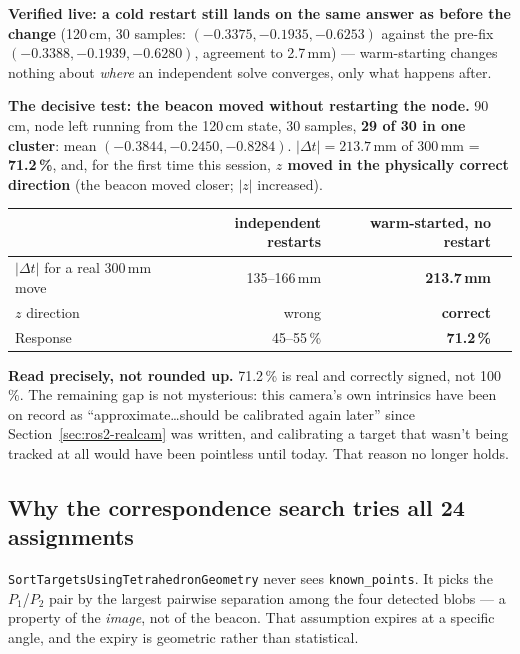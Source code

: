 \documentclass[11pt]{report}
\begin{document}
\textbf{Verified live: a cold restart still lands on the same answer as
before the change} (120\,cm, 30 samples: $(-0.3375,-0.1935,-0.6253)$ against
the pre-fix $(-0.3388,-0.1939,-0.6280)$, agreement to 2.7\,mm) ---
warm-starting changes nothing about \emph{where} an independent solve
converges, only what happens after.

\textbf{The decisive test: the beacon moved without restarting the node.}
90\,cm, node left running from the 120\,cm state, 30 samples, \textbf{29 of
30 in one cluster}: mean $(-0.3844,-0.2450,-0.8284)$.
$|\Delta t| = 213.7$\,mm of 300\,mm = \textbf{71.2\,\%}, and, for the first
time this session, \textbf{$z$ moved in the physically correct direction}
(the beacon moved closer; $|z|$ increased).

\begin{center}
\begin{tabular}{@{}lrrr@{}}
\toprule
 & independent restarts & warm-started, no restart & \\
\midrule
$|\Delta t|$ for a real 300\,mm move & 135--166\,mm & \textbf{213.7\,mm} & \\
$z$ direction & wrong & \textbf{correct} & \\
Response & 45--55\,\% & \textbf{71.2\,\%} & \\
\bottomrule
\end{tabular}
\end{center}

\textbf{Read precisely, not rounded up.} 71.2\,\% is real and correctly
signed, not 100\,\%. The remaining gap is not mysterious: this camera's own
intrinsics have been on record as ``approximate\ldots should be calibrated
again later'' since Section~\ref{sec:ros2-realcam} was written, and
calibrating a target that wasn't being tracked at all would have been
pointless until today. That reason no longer holds.

\subsection{Why the correspondence search tries all 24 assignments}
\label{sec:sortlimit}

\texttt{SortTargetsUsingTetrahedronGeometry} never sees
\texttt{known\_points}. It picks the $P_1$/$P_2$ pair by the largest
pairwise separation among the four detected blobs --- a property of the
\emph{image}, not of the beacon. That assumption expires at a specific
angle, and the expiry is geometric rather than statistical.
\end{document}
